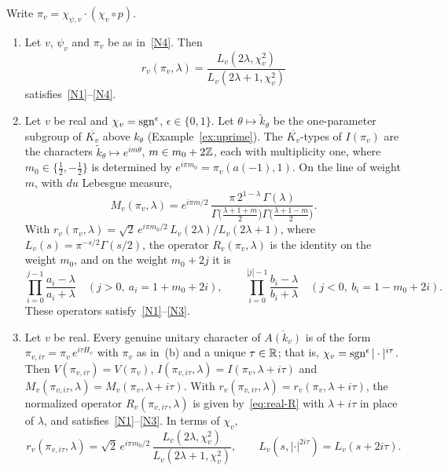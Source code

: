 \begin{lemma}\label{lem:explicit-r}
Write $\pi_v=\chi_{\psi,v}\cdot(\chi_v\circ p)$.
\begin{enumerate}[label=(\alph*)]
\item Let $v$, $\psi_v$ and $\pi_v$ be as in~\ref{N4}. Then
  \[
  r_v(\pi_v,\lambda)=\frac{L_v(2\lambda,\chi_v^2)}{L_v(2\lambda+1,\chi_v^2)}
  \]
  satisfies~\ref{N1}--\ref{N4}.
\item Let $v$ be real and $\chi_v=\operatorname{sgn}^\epsilon$,
  $\epsilon\in\{0,1\}$. Let $\theta\mapsto\tilde k_\theta$ be the
  one-parameter subgroup of $\overline{K_v}$ above $k_\theta$
  (Example~\ref{ex:uprime}). The $\overline{K_v}$-types of $I(\pi_v)$ are
  the characters $\tilde k_\theta\mapsto e^{im\theta}$, $m\in m_0+2\mathbb{Z}$,
  each with multiplicity one, where $m_0\in\{\frac12,-\frac12\}$ is
  determined by $e^{i\pi m_0}=\pi_v(a(-1),1)$. On the line of weight $m$,
  with $du$ Lebesgue measure,
  \begin{equation}\label{eq:real-M}
  M_v(\pi_v,\lambda)=e^{i\pi m/2}\,\frac{\pi\,2^{1-\lambda}\,\Gamma(\lambda)}
  {\Gamma\bigl(\frac{\lambda+1+m}2\bigr)\Gamma\bigl(\frac{\lambda+1-m}2\bigr)} .
  \end{equation}
  With $r_v(\pi_v,\lambda)=\sqrt2\,e^{i\pi m_0/2}\,L_v(2\lambda)/L_v(2\lambda+1)$,
  where $L_v(s)=\pi^{-s/2}\Gamma(s/2)$, the operator $R_v(\pi_v,\lambda)$
  is the identity on the weight $m_0$, and on the weight $m_0+2j$ it is
  \begin{equation}\label{eq:real-R}
  \prod_{i=0}^{j-1}\frac{a_i-\lambda}{a_i+\lambda}\quad(j>0,\ a_i=1+m_0+2i),
  \qquad
  \prod_{i=0}^{|j|-1}\frac{b_i-\lambda}{b_i+\lambda}\quad(j<0,\ b_i=1-m_0+2i).
  \end{equation}
  These operators satisfy~\ref{N1}--\ref{N3}.
\item Let $v$ be real. Every genuine unitary character of
  $\overline{A(k_v)}$ is of the form $\pi_{v,i\tau}=\pi_v\,e^{i\tau H_v}$
  with $\pi_v$ as in~(b) and a unique $\tau\in\mathbb{R}$; that is,
  $\chi_v=\operatorname{sgn}^\epsilon|\cdot|^{i\tau}$. Then
  $V(\pi_{v,i\tau})=V(\pi_v)$, $I(\pi_{v,i\tau},\lambda)=I(\pi_v,\lambda+
  i\tau)$ and $M_v(\pi_{v,i\tau},\lambda)=M_v(\pi_v,\lambda+i\tau)$. With
  $r_v(\pi_{v,i\tau},\lambda)=r_v(\pi_v,\lambda+i\tau)$, the normalized
  operator $R_v(\pi_{v,i\tau},\lambda)$ is given by~\eqref{eq:real-R} with
  $\lambda+i\tau$ in place of $\lambda$, and satisfies~\ref{N1}--\ref{N3}.
  In terms of $\chi_v$,
  \[
  r_v(\pi_{v,i\tau},\lambda)=\sqrt2\,e^{i\pi m_0/2}\,
  \frac{L_v(2\lambda,\chi_v^2)}{L_v(2\lambda+1,\chi_v^2)},\qquad
  L_v(s,|\cdot|^{2i\tau})=L_v(s+2i\tau).
  \]
\end{enumerate}
\end{lemma}

